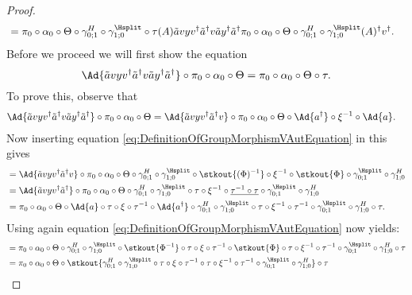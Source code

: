 \begin{proof}
\begin{align}
		\label{eq:lem:phi1phi2matchingCondition:Proof_v_Part1Appendix}
		&=\pi_0\circ\alpha_0\circ\Theta\circ\gamma^{H}_{0;1}\circ\gamma^{\Hsplit}_{1;0}\circ\tau(A)\tilde{a}vyv^\dagger\tilde{a}^\dagger v \tilde{a}y^\dagger\tilde{a}^\dagger \pi_0\circ\alpha_0\circ\Theta\circ\gamma^{H}_{0;1}\circ\gamma^{\Hsplit}_{1;0}(A)^\dagger v^\dagger.
	\end{align}
	Before we proceed we will first show the equation
	\begin{equation}\label{eq:lem:phi1phi2matchingCondition:Proof_v_Part2Appendix}
		\Ad{\tilde{a}vyv^\dagger\tilde{a}^\dagger v\tilde{a}y^\dagger\tilde{a}^\dagger}\circ\pi_0\circ\alpha_0\circ\Theta=\pi_0\circ\alpha_0\circ\Theta\circ\tau.
	\end{equation}
	To prove this, observe that
	\begin{align}
		&\Ad{\tilde{a}vyv^\dagger\tilde{a}^\dagger v\tilde{a}y^\dagger\tilde{a}^\dagger}\circ\pi_0\circ\alpha_0\circ\Theta=\Ad{\tilde{a}vyv^\dagger\tilde{a}^\dagger v}\circ\pi_0\circ\alpha_0\circ\Theta\circ\Ad{a^\dagger}\circ\xi^{-1}\circ\Ad{a}.
	\end{align}
	Now inserting equation \eqref{eq:DefinitionOfGroupMorphismVAutEquation} in this gives
	\begin{align}
		\nonumber
		&=\Ad{\tilde{a}vyv^\dagger\tilde{a}^\dagger v}\circ\pi_0\circ\alpha_0\circ\Theta\circ\gamma^{H}_{0;1}\circ\gamma^{\Hsplit}_{1;0}\circ\stkout{(\Phi)^{-1}}\circ\xi^{-1}\circ\stkout{\Phi}\circ\gamma^{\Hsplit}_{0;1}\circ\gamma^H_{1;0}\\
		&=\Ad{\tilde{a}vyv^\dagger\tilde{a}^\dagger }\circ\pi_0\circ\alpha_0\circ\Theta\circ\gamma^{H}_{0;1}\circ\gamma^{\Hsplit}_{1;0}\circ\tau\circ\xi^{-1}\circ\underline{\tau^{-1}\circ\tau}\circ\gamma^{\Hsplit}_{0;1}\circ\gamma^H_{1;0}\\
		\nonumber
		&=\pi_0\circ\alpha_0\circ\Theta\circ\Ad{a}\circ\tau\circ\xi\circ\tau^{-1}\circ\Ad{a^\dagger}\circ\gamma^{H}_{0;1}\circ\gamma^{\Hsplit}_{1;0}\circ\tau\circ\xi^{-1}\circ\tau^{-1}\circ\gamma^{\Hsplit}_{0;1}\circ\gamma^H_{1;0}\circ\tau.
	\end{align}
	Using again equation \eqref{eq:DefinitionOfGroupMorphismVAutEquation} now yields:
	\begin{align}
		&=\pi_0\circ\alpha_0\circ\Theta\circ\gamma^{H}_{0;1}\circ\gamma^{\Hsplit}_{1;0}\circ\stkout{\Phi^{-1}}\circ\tau\circ\xi\circ\tau^{-1}\circ\stkout{\Phi}\circ\tau\circ\xi^{-1}\circ\tau^{-1}\circ\gamma^{\Hsplit}_{0;1}\circ\gamma^H_{1;0}\circ\tau\\
		\nonumber
		&=\pi_0\circ\alpha_0\circ\Theta\circ\stkout{\gamma^{H}_{0;1}\circ\gamma^{\Hsplit}_{1;0}\circ\tau\circ\xi\circ\tau^{-1}\circ\tau\circ\xi^{-1}\circ\tau^{-1}\circ\gamma^{\Hsplit}_{0;1}\circ\gamma^H_{1;0}}\circ\tau

\end{align}
\end{proof}
